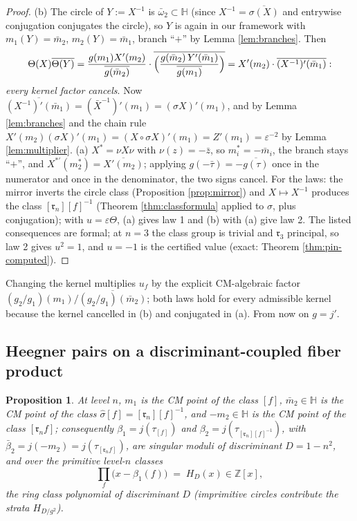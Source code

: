\documentclass[11pt]{amsart}
\numberwithin{equation}{section}
\theoremstyle{plain}
\newtheorem{proposition}[theorem]{Proposition}
\theoremstyle{definition}
\theoremstyle{remark}
\newcommand{\Z}{\mathbb{Z}}
\newcommand{\HH}{\mathbb{H}}
\newcommand{\idealr}{\mathfrak{r}}
\begin{document}
\begin{proof}
(b) The circle of $Y := X^{-1}$ is $\bar\omega_2 \subset \HH$ (since
$X^{-1} = \overline{\sigma(X)}$ and entrywise conjugation conjugates
the circle), so $Y$ is again in our framework with $m_1(Y) = \bar
m_2$, $m_2(Y) = \bar m_1$, branch ``$+$'' by Lemma \ref{lem:branches}.
Then
\[
  \Theta(X)\overline{\Theta(Y)}
  = \frac{g(m_1)X'(m_2)}{\overline{g(\bar m_2)}}\cdot
  \overline{\Bigl(\frac{g(\bar m_2)\,Y'(\bar m_1)}
  {\overline{g(m_1)}}\Bigr)}
  = X'(m_2)\cdot\overline{(X^{-1})'(\bar m_1)}:
\]
\emph{every kernel factor cancels}.  Now
$\overline{(X^{-1})'(\bar m_1)} = (\bar X^{-1})'(m_1) =
(\sigma X)'(m_1)$, and by Lemma \ref{lem:branches} and the chain rule
$X'(m_2)(\sigma X)'(m_1) = (X\circ\sigma X)'(m_1) = Z'(m_1) =
\varepsilon^{-2}$ by Lemma \ref{lem:multiplier}.
(a) $X^{\ast} = \nu X\nu$ with $\nu(z) = -\bar z$, so $m_i^{\ast} =
-\bar m_i$, the branch stays ``$+$'', and $X^{\ast\prime}(m_2^\ast) =
\overline{X'(m_2)}$; applying $g(-\bar\tau) = -\overline{g(\tau)}$
once in the numerator and once in the denominator, the two signs
cancel.
For the laws: the mirror inverts the circle class (Proposition
\ref{prop:mirror}) and $X \mapsto X^{-1}$ produces the class
$[\idealr_n][f]^{-1}$ (Theorem \ref{thm:classformula} applied to
$\sigma$, plus conjugation); with $u = \varepsilon\Theta$, (a) gives
law 1 and (b) with (a) give law 2.  The listed consequences are
formal; at $n = 3$ the class group is trivial and $\idealr_3$
principal, so law 2 gives $u^2 = 1$, and $u = -1$ is the certified
value (exact: Theorem \ref{thm:pin-computed}).
\end{proof}

Changing the kernel multiplies $u_f$ by the explicit CM-algebraic
factor $(g_2/g_1)(m_1)\big/\overline{(g_2/g_1)(\bar m_2)}$; both laws
hold for every admissible kernel because the kernel cancelled in (b)
and conjugated in (a).  From now on $g = j'$.

\subsection{Heegner pairs on a discriminant-coupled fiber product}
\label{subsec:heegner}

\begin{proposition}\label{prop:singularmoduli}
At level $n$, $m_1$ is the CM point of the class $[f]$, $\bar m_2 \in
\HH$ is the CM point of the class $\hat\sigma[f] = [\idealr_n][f]^{-1}$,
and $-m_2 \in \HH$ is the CM point of the class $[\idealr_nf]$;
consequently $\beta_1 = j(\tau_{[f]})$ and $\beta_2 =
j(\tau_{[\idealr_n][f]^{-1}})$, with $\bar\beta_2 = j(-m_2) =
j(\tau_{[\idealr_nf]})$, are singular moduli of discriminant
$D = 1 - n^2$, and over the primitive level-$n$ classes
\[
  \prod_{f}\bigl(x - \beta_1(f)\bigr) \;=\; H_{D}(x) \in \Z[x],
\]
the ring class polynomial of discriminant $D$ (imprimitive circles
contribute the strata $H_{D/g^2}$).
\end{proposition}
\end{document}
